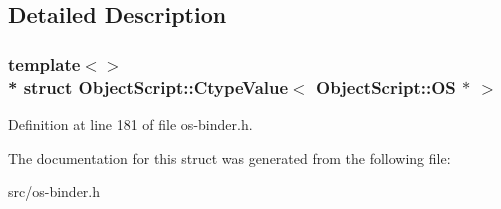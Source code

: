 \subsection{Detailed Description}
\subsubsection*{template$<$$>$\\*
struct Object\+Script\+::\+Ctype\+Value$<$ Object\+Script\+::\+O\+S $\ast$ $>$}



Definition at line 181 of file os-\/binder.\+h.



The documentation for this struct was generated from the following file\+:\begin{DoxyCompactItemize}
\item 
src/os-\/binder.\+h\end{DoxyCompactItemize}
